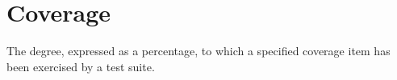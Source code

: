 \section{Coverage}
\label{sec:Coverage}

The degree, expressed as a percentage, to which a specified coverage item has been exercised by a test suite.